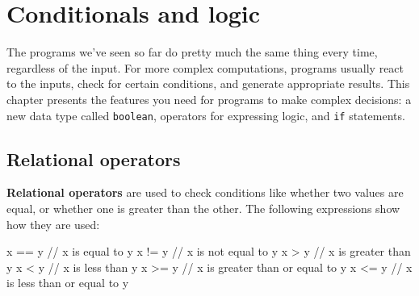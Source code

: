 \documentclass[12pt]{book}
\theoremstyle{exercise}
\newcommand{\java}[1]{\verb"#1"}
\begin{document}
\chapter{Conditionals and logic}


The programs we've seen so far do pretty much the same thing every time, regardless of the input.
For more complex computations, programs usually react to the inputs, check for certain conditions, and generate appropriate results.
This chapter presents the features you need for programs to make complex decisions: a new data type called \java{boolean}, operators for expressing logic, and \java{if} statements.




\section{Relational operators}


{\bf Relational operators} are used to check conditions like whether two values are equal, or whether one is greater than the other.
The following expressions show how they are used:

\begin{code}
    x == y          // x is equal to y
    x != y          // x is not equal to y
    x > y           // x is greater than y
    x < y           // x is less than y
    x >= y          // x is greater than or equal to y
    x <= y          // x is less than or equal to y
\end{code}
\end{document}

